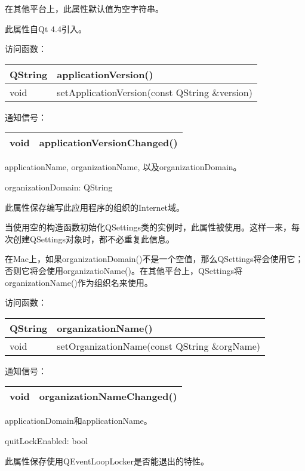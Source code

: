 在其他平台上，此属性默认值为空字符串。

此属性自Qt 4.4引入。

访问函数：

\begin{tabular}{|l|l|}
\hline
QString&	applicationVersion()\\
\hline
void&	setApplicationVersion(const QString \&version)\\
\hline
\end{tabular}

通知信号：

\begin{tabular}{|l|l|}
\hline
void	&applicationVersionChanged()\\
\hline
\end{tabular}

\begin{notice}[另请参阅]
applicationName, organizationName, 以及organizationDomain。
\end{notice}

organizationDomain: QString

此属性保存编写此应用程序的组织的Internet域。

当使用空的构造函数初始化QSettings类的实例时，此属性被使用。这样一来，每次创建QSettings对象时，都不必重复此信息。

在Mac上，如果organizationDomain()不是一个空值，那么QSettings将会使用它；否则它将会使用organizatioName()。在其他平台上，QSettings将organizationName()作为组织名来使用。

访问函数：

\begin{tabular}{|l|l|}
\hline
QString&	organizationName()\\
\hline
void&	setOrganizationName(const QString \&orgName)\\
\hline
\end{tabular}

通知信号：

\begin{tabular}{|l|l|}
\hline
void	&organizationNameChanged()\\
\hline
\end{tabular}



\begin{notice}[另请参阅]
 applicationDomain和applicationName。
\end{notice}

quitLockEnabled: bool

此属性保存使用QEventLoopLocker是否能退出的特性。

